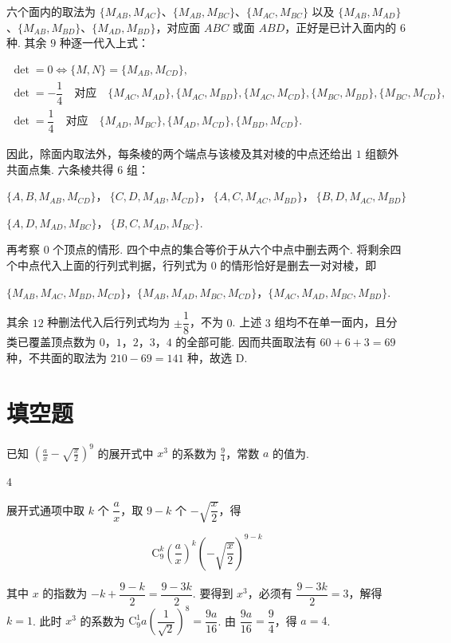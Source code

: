 \begin{solution}
六个面内的取法为 \(\{M_{AB},M_{AC}\}\)、\(\{M_{AB},M_{BC}\}\)、\(\{M_{AC},M_{BC}\}\) 以及 \(\{M_{AB},M_{AD}\}\)、\(\{M_{AB},M_{BD}\}\)、\(\{M_{AD},M_{BD}\}\)，对应面 \(ABC\) 或面 \(ABD\)，正好是已计入面内的 \(6\) 种. 其余 \(9\) 种逐一代入上式：

\[
\begin{gathered}
\det=0\Longleftrightarrow\{M,N\}=\{M_{AB},M_{CD}\},\\
\det=-\dfrac14\quad\text{对应}\quad\{M_{AC},M_{AD}\},\{M_{AC},M_{BD}\},\{M_{AC},M_{CD}\},\{M_{BC},M_{BD}\},\{M_{BC},M_{CD}\},\\
\det=\dfrac14\quad\text{对应}\quad\{M_{AD},M_{BC}\},\{M_{AD},M_{CD}\},\{M_{BD},M_{CD}\}.
\end{gathered}
\]

因此，除面内取法外，每条棱的两个端点与该棱及其对棱的中点还给出 \(1\) 组额外共面点集. 六条棱共得 \(6\) 组：

\(\{A,B,M_{AB},M_{CD}\}\)，\(\ \{C,D,M_{AB},M_{CD}\}\)，\(\ \{A,C,M_{AC},M_{BD}\}\)，\(\ \{B,D,M_{AC},M_{BD}\}\)

\(\{A,D,M_{AD},M_{BC}\}\)，\(\ \{B,C,M_{AD},M_{BC}\}\).

再考察 \(0\) 个顶点的情形. 四个中点的集合等价于从六个中点中删去两个. 将剩余四个中点代入上面的行列式判据，行列式为 \(0\) 的情形恰好是删去一对对棱，即

\(\{M_{AB},M_{AC},M_{BD},M_{CD}\}\)，\(\{M_{AB},M_{AD},M_{BC},M_{CD}\}\)，\(\{M_{AC},M_{AD},M_{BC},M_{BD}\}\).

其余 \(12\) 种删法代入后行列式均为 \(\pm\dfrac18\)，不为 \(0\). 上述 \(3\) 组均不在单一面内，且分类已覆盖顶点数为 \(0\)，\(1\)，\(2\)，\(3\)，\(4\) 的全部可能. 因而共面取法有 \(60+6+3=69\) 种，不共面的取法为 \(210-69=141\) 种，故选 D.
\end{solution}

\section{填空题}

\begin{problem}
已知 \(\left(\frac{a}{x} - \sqrt{\frac{x}{2}}\right)^{9}\) 的展开式中 \(x^{3}\) 的系数为 \(\frac{9}{4}\)，常数 \(a\) 的值为\fillinblank{}.
\end{problem}

\begin{answer}
\(4\)
\end{answer}

\begin{solution}
展开式通项中取 \(k\) 个 \(\dfrac{a}{x}\)，取 \(9-k\) 个 \(-\sqrt{\dfrac{x}{2}}\)，得

\[
\mathrm C_{9}^{k}\left(\frac{a}{x}\right)^{k}\left(-\sqrt{\frac{x}{2}}\right)^{9-k}
\]

其中 \(x\) 的指数为 \(-k+\dfrac{9-k}{2}=\dfrac{9-3k}{2}\). 要得到 \(x^{3}\)，必须有 \(\dfrac{9-3k}{2}=3\)，解得 \(k=1\). 此时 \(x^{3}\) 的系数为 \(\mathrm C_{9}^{1}a\left(\dfrac{1}{\sqrt{2}}\right)^{8}=\dfrac{9a}{16}\). 由 \(\dfrac{9a}{16}=\dfrac94\)，得 \(a=4\).
\end{solution}


